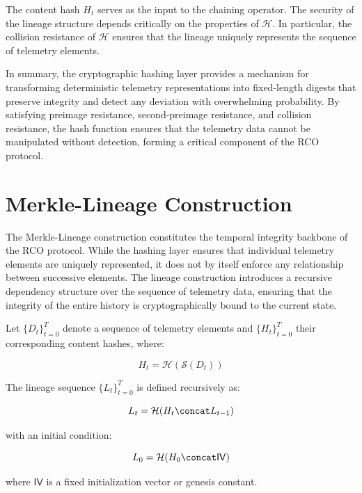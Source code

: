The content hash $H_t$ serves as the input to the chaining operator. The security of the lineage structure depends critically on the properties of $\mathcal{H}$. In particular, the collision resistance of $\mathcal{H}$ ensures that the lineage uniquely represents the sequence of telemetry elements.

In summary, the cryptographic hashing layer provides a mechanism for transforming deterministic telemetry representations into fixed-length digests that preserve integrity and detect any deviation with overwhelming probability. By satisfying preimage resistance, second-preimage resistance, and collision resistance, the hash function ensures that the telemetry data cannot be manipulated without detection, forming a critical component of the RCO protocol.

\section{Merkle-Lineage Construction}

The Merkle-Lineage construction constitutes the temporal integrity backbone of the RCO protocol. While the hashing layer ensures that individual telemetry elements are uniquely represented, it does not by itself enforce any relationship between successive elements. The lineage construction introduces a recursive dependency structure over the sequence of telemetry data, ensuring that the integrity of the entire history is cryptographically bound to the current state.

Let $\{D_t\}_{t=0}^{T}$ denote a sequence of telemetry elements and $\{H_t\}_{t=0}^{T}$ their corresponding content hashes, where:

\begin{equation}
H_t = \mathcal{H}(\mathcal{S}(D_t))
\end{equation}

The lineage sequence $\{L_t\}_{t=0}^{T}$ is defined recursively as:

\begin{equation}
L_t = \mathcal{H}(H_t \concat L_{t-1})
\end{equation}

with an initial condition:

\begin{equation}
L_0 = \mathcal{H}(H_0 \concat \mathsf{IV})
\end{equation}

where $\mathsf{IV}$ is a fixed initialization vector or genesis constant.

